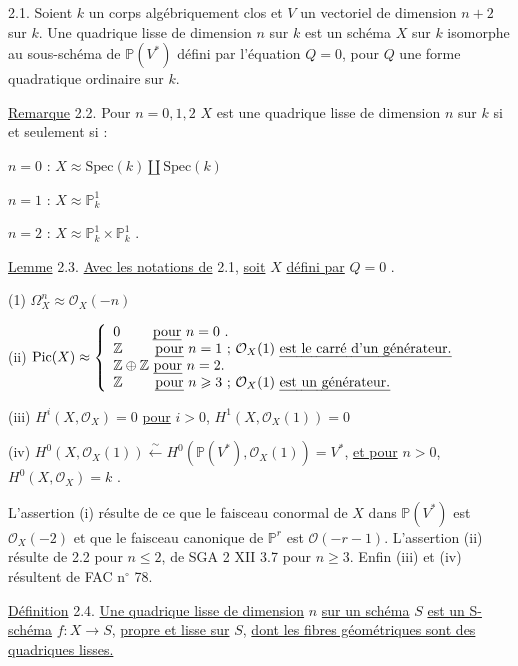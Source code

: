 2.1. Soient $k$ un corps algébriquement clos et $V$ un vectoriel de dimension $n+2$ sur $k$. Une quadrique lisse de dimension $n$ sur $k$ est un schéma $X$ sur $k$ isomorphe au sous-schéma de $\mathbb{P}(V^*)$ défini par l'équation $Q=0$, pour $Q$ une forme quadratique ordinaire sur $k$.

\underline{Remarque} 2.2. Pour $n = 0,1,2$ $X$ est une quadrique lisse de dimension $n$ sur $k$ si et seulement si :

$n = 0$ \qquad : \qquad $X \approx \mathrm{Spec}(k) \amalg \mathrm{Spec}(k)$

$n = 1$ \qquad : \qquad $X \approx \mathbb{P}^1_k$

$n = 2$ \qquad : \qquad $X \approx \mathbb{P}^1_k \times \mathbb{P}^1_k$ .



\underline{Lemme} 2.3. \underline{Avec les notations de} 2.1, \underline{soit} $X$ \underline{défini par} $Q = 0$ .

(1) \qquad $\Omega^n_X \approx \mathcal{O}_X(-n)$

(ii) \quad $\mathrm{Pic}(X) \approx \left\{ \begin{array}{l} \mbox{$0$ \qquad \underline{pour} $n = 0$ .} \\ \mbox{$\mathbb{Z}$ \qquad \underline{pour} $n = 1$ ; $\mathcal{O}_X(1)$ \underline{est le carré d'un générateur.}} \\ \mbox{$\mathbb{Z} \oplus \mathbb{Z}$ \underline{pour} $n =2$.} \\ \mbox{$\mathbb{Z}$ \qquad \underline{pour} $n \geqslant 3$ ; $\mathcal{O}_X(1)$ \underline{est un générateur.}} \end{array} \right.$

(iii) \quad $H^i(X,\mathcal{O}_X) = 0$ \underline{pour} $i > 0$, \qquad $H^1(X,\mathcal{O}_X(1)) = 0$

(iv) \quad $H^0(X,\mathcal{O}_X(1)) \stackrel{\sim}{\longleftarrow} H^0( \mathbb{P}(V^*),\mathcal{O}_X(1)) = V^*$, \underline{et pour} $n > 0$, $H^0(X,\mathcal{O}_X) = k$ .

L'assertion (i) résulte de ce que le faisceau conormal de $X$ dans $\mathbb{P}(V^*)$ est $\mathcal{O}_X(-2)$ et que le faisceau canonique de $\mathbb{P}^r$ est $\mathcal{O}(-r-1)$. L'assertion (ii) résulte de 2.2 pour $n \leqslant 2$, de SGA 2 XII 3.7 pour $n \geqslant 3$. Enfin (iii) et (iv) résultent de FAC n$^\circ$ 78.

\underline{Définition} 2.4. \underline{Une quadrique lisse de dimension} $n$ \underline{sur un schéma} $S$ \underline{est un S-schéma} $f : X \longrightarrow S$, \underline{propre et lisse sur} $S$, \underline{dont les fibres géométriques sont des quadriques lisses.}

